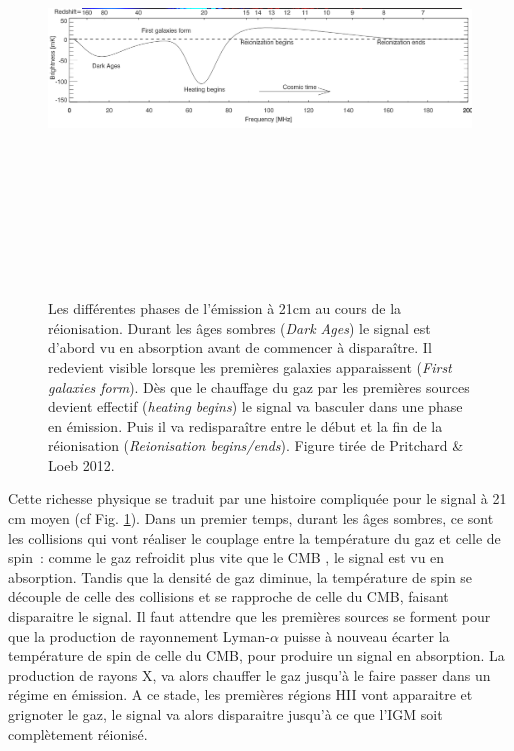 \begin{figure}[htbp]
	\centering
		\includegraphics[height=12cm]{figs/21cm.png}
		\caption[L'histoire du signal à 21cm de la réionisation]{Les différentes phases de l'émission à 21cm au cours de la réionisation. Durant les âges sombres (\textit{Dark Ages}) le signal est d'abord vu en absorption avant de commencer à disparaître. Il redevient visible lorsque les premières galaxies apparaissent (\textit{First galaxies form}). Dès que le chauffage du gaz par les premières sources devient effectif (\textit{heating begins}) le signal va basculer dans une phase en émission. Puis il va redisparaître entre le début et la fin de la réionisation (\textit{Reionisation begins/ends}). Figure tirée de Pritchard \& Loeb 2012.}
	\label{f:21cm}
\end{figure} 

Cette richesse physique se traduit par une histoire compliquée pour le signal à 21 cm moyen (cf Fig. \ref{f:21cm}). Dans un premier temps, durant les âges sombres, ce sont les collisions qui vont réaliser le couplage entre la température du gaz et celle de spin~: comme le gaz refroidit plus vite que le CMB , le signal est vu en absorption. Tandis que la densité de gaz diminue, la température de spin se découple de celle des collisions et se rapproche de celle du CMB, faisant disparaitre le signal. Il faut attendre que les premières sources se forment pour que la production de rayonnement Lyman-$\alpha$ puisse à nouveau écarter la température de spin de celle du CMB, pour produire un signal en absorption. La production de rayons X, va alors chauffer le gaz jusqu'à le faire passer dans un régime en émission. A ce stade, les premières régions HII vont apparaitre et grignoter le gaz, le signal va alors disparaitre jusqu'à ce que l'IGM soit complètement réionisé.

